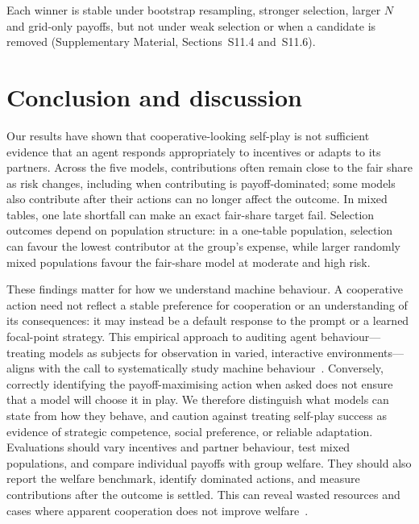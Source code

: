 \documentclass[sigconf,anonymous]{aamas}
\begin{document}
Each winner is stable under bootstrap resampling, stronger selection, larger $N$ and grid-only payoffs, but not under weak selection or when a candidate is removed (Supplementary Material, Sections~S11.4 and~S11.6).

\section{Conclusion and discussion}
\label{sec:discussion}

Our results have shown that cooperative-looking self-play is not sufficient evidence that an agent responds appropriately to incentives or adapts to its partners. Across the five models, contributions often remain close to the fair share as risk changes, including when contributing is payoff-dominated; some models also contribute after their actions can no longer affect the outcome. In mixed tables, one late shortfall can make an exact fair-share target fail. Selection outcomes depend on population structure: in a one-table population, selection can favour the lowest contributor at the group’s expense, while larger randomly mixed populations favour the fair-share model at moderate and high risk.

These findings matter for how we understand machine behaviour. A cooperative action need not reflect a stable preference for cooperation or an understanding of its consequences: it may instead be a default response to the prompt or a learned focal-point strategy. This empirical approach to auditing agent behaviour—treating models as subjects for observation in varied, interactive environments—aligns with the call to systematically study machine behaviour~\cite{rahwan2019machine}. Conversely, correctly identifying the payoff-maximising action when asked does not ensure that a model will choose it in play. We therefore distinguish what models can state from how they behave, and caution against treating self-play success as evidence of strategic competence, social preference, or reliable adaptation. Evaluations should vary incentives and partner behaviour, test mixed populations, and compare individual payoffs with group welfare. They should also report the welfare benchmark, identify dominated actions, and measure contributions after the outcome is settled. This can reveal wasted resources and cases where apparent cooperation does not improve welfare~\cite{han2024evolutionary}. 
\end{document}

